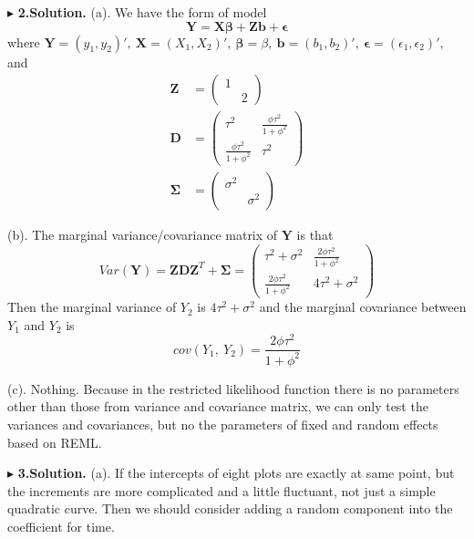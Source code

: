 \documentclass[letterpaper, 12pt]{article}
\newcommand{\ba}{$$\begin{aligned}}
\newcommand{\ea}{\end{aligned}$$}
\begin{document}
$\blacktriangleright$ \textbf{2.\quad Solution.} 
(a). We have the form of model 
$$
\bm{Y}=\bm{X}\bm{\beta}+\bm{Z}\bm{b}+\bm{\epsilon}
$$
where $
\bm{Y}=(y_1,y_2)',~
\bm{X}=(X_1,X_2)',~
\bm{\beta}=\beta,~
\bm{b}=(b_1,b_2)',~
\bm{\epsilon}=(\epsilon_1,\epsilon_2)',
$ and
\ba
\bm{Z}&=\left(\begin{matrix}
1\\
&2\end{matrix}\right)\\
\bm{D}&=\left(\begin{matrix}
\tau^2&\frac{\phi\tau^2}{1+\phi^2}\\
\frac{\phi\tau^2}{1+\phi^2}&\tau^2\end{matrix}\right)\\
\bm{\Sigma}&=\left(\begin{matrix}
\sigma^2\\
&\sigma^2\end{matrix}\right)
\ea


(b). The marginal variance/covariance matrix of $\bm{Y}$ is that
$$
Var(\bm{Y})=\bm{ZDZ}^T+\bm{\Sigma}=\left(\begin{matrix}
\tau^2+\sigma^2&\frac{2\phi\tau^2}{1+\phi^2}\\
\frac{2\phi\tau^2}{1+\phi^2}&4\tau^2+\sigma^2\end{matrix}\right)
$$
Then the marginal variance of $Y_2$ is $4\tau^2+\sigma^2$ and the marginal covariance between $Y_1$ and $Y_2$ is 
$$
cov(Y_1,~Y_2)=\frac{2\phi\tau^2}{1+\phi^2}
$$



(c). Nothing. Because in the restricted likelihood function there is no parameters other than those from variance and covariance matrix, we can only test the variances and covariances, but no the parameters of fixed and random effects based on REML. 


$\blacktriangleright$ \textbf{3.\quad Solution.} 
(a). If the intercepts of eight plots are exactly at same point, but the increments are more complicated and a little fluctuant, not just a simple quadratic curve. Then we should consider adding a random component into the coefficient for time.
\end{document}
